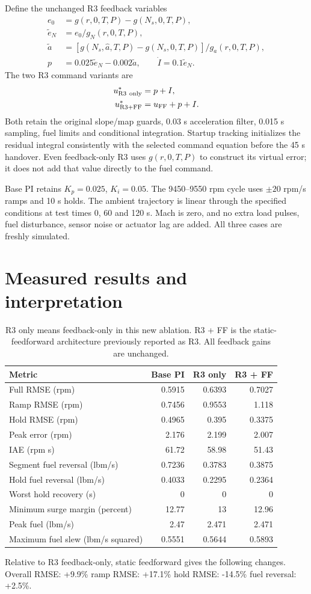 \documentclass[11pt,a4paper]{article}
\begin{document}
Define the unchanged R3 feedback variables
\begin{align}
e_0&=g(r,0,T,P)-g(N_s,0,T,P),\\
\tilde e_N&=e_0/g_N(r,0,T,P),\\
\tilde a&=[g(N_s,\hat a,T,P)-g(N_s,0,T,P)]/g_a(r,0,T,P),\\
p&=0.025\tilde e_N-0.002\tilde a,\qquad\dot I=0.1\tilde e_N.
\end{align}
The two R3 command variants are
\begin{align}
u_{\rm R3\ only}^{*}&=p+I,\\
u_{\rm R3+FF}^{*}&=u_{\rm FF}+p+I.
\end{align}
Both retain the original slope/map guards, 0.03 s acceleration filter, 0.015 s sampling, fuel limits and conditional integration. Startup tracking initializes the residual integral consistently with the selected command equation before the 45 s handover. Even feedback-only R3 uses $g(r,0,T,P)$ to construct its virtual error; it does not add that value directly to the fuel command.

Base PI retains $K_p=0.025$, $K_i=0.05$. The 9450--9550 rpm cycle uses $\pm20$ rpm/s ramps and 10 s holds. The ambient trajectory is linear through the specified conditions at test times 0, 60 and 120 s. Mach is zero, and no extra load pulses, fuel disturbance, sensor noise or actuator lag are added. All three cases are freshly simulated.
\clearpage
\section{Measured results and interpretation}
\begin{table}[H]\centering\small\begin{tabular}{lrrr}\toprule
Metric & Base PI & R3 only & R3 + FF\\\midrule
Full RMSE (rpm) & 0.5915 & 0.6393 & 0.7027\\
Ramp RMSE (rpm) & 0.7456 & 0.9553 & 1.118\\
Hold RMSE (rpm) & 0.4965 & 0.395 & 0.3375\\
Peak error (rpm) & 2.176 & 2.199 & 2.007\\
IAE (rpm s) & 61.72 & 58.98 & 51.43\\
Segment fuel reversal (lbm/s) & 0.7236 & 0.3783 & 0.3875\\
Hold fuel reversal (lbm/s) & 0.4033 & 0.2295 & 0.2364\\
Worst hold recovery (s) & 0 & 0 & 0\\
Minimum surge margin (percent) & 12.77 & 13 & 12.96\\
Peak fuel (lbm/s) & 2.47 & 2.471 & 2.471\\
Maximum fuel slew (lbm/s squared) & 0.5551 & 0.5644 & 0.5893\\
\bottomrule\end{tabular}\caption{R3 only means feedback-only in this new ablation. R3 + FF is the static-feedforward architecture previously reported as R3. All feedback gains are unchanged.}\end{table}
Relative to R3 feedback-only, static feedforward gives the following changes. Overall RMSE: +9.9\% ramp RMSE: +17.1\% hold RMSE: -14.5\% fuel reversal: +2.5\%.
\end{document}
